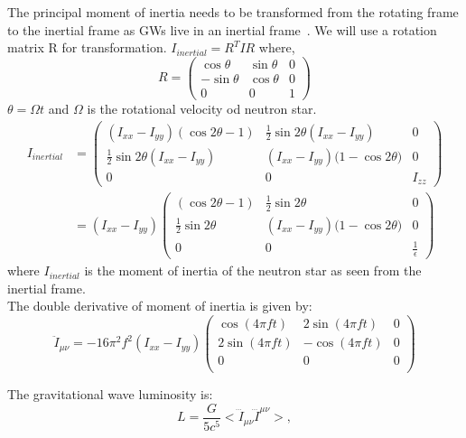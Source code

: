 \documentclass{ttuthes2007}
\begin{document}
The principal moment of inertia needs to be transformed from the rotating frame to 
the inertial frame as \acp{GW} live in an inertial frame~\cite{PhysRevD.20.351}. 
We will use a rotation matrix R for transformation.
$I_{inertial}= R^T I R$
where, 
\begin{equation}
R=
\begin{pmatrix}
\cos\theta & \sin\theta & 0 \\
-\sin\theta & \cos\theta & 0 \\
0 & 0 & 1
\end{pmatrix}
\end{equation}
$\theta=\Omega t$ and $\Omega$ is the rotational velocity od neutron star.
\begin{equation}
\begin{split}
I_{inertial}&=
\begin{pmatrix}
(I_{xx}-I_{yy})(\cos{2\theta} -1) & \frac{1}{2}\sin{2\theta}(I_{xx}-I_{yy}) & 0 \\
\frac{1}{2}\sin{2\theta}(I_{xx}-I_{yy}) & (I_{xx}-I_{yy})(1-\cos{2\theta)} & 0  \\
0 & 0 & I_{zz}
\end{pmatrix}\\
&=(I_{xx}-I_{yy})
\begin{pmatrix}
(\cos2\theta -1) & \frac{1}{2}\sin{2\theta} & 0 \\
\frac{1}{2}\sin{2\theta} & (I_{xx}-I_{yy})(1-\cos{2\theta)} & 0  \\
0 & 0 & \frac{1}{\epsilon}
\end{pmatrix}
\end{split}
\end{equation}
where $I_{inertial}$ is the moment of inertia of the neutron star as seen from
the inertial frame.\\
The double derivative of moment of inertia is given by:
\begin{equation} \label{2ndMI}
\ddot{I}_{\mu\nu}=-16\pi ^2f^2(I_{xx}-I_{yy})
\begin{pmatrix}
\cos{(4\pi f t)} & 2\sin{(4\pi f t)} & 0 \\
2\sin{(4\pi f t)} & -\cos{(4\pi f t)} & 0 \\
0 & 0 & 0 \\
\end{pmatrix}
\end{equation}

The gravitational wave luminosity is:
\begin{equation}\label{GWLuminosity}
L= \frac{G}{5c^5}<\dddot{I}_{\mu\nu}\dddot{I}^{\mu\nu}>,
\end{equation}
\end{document}
